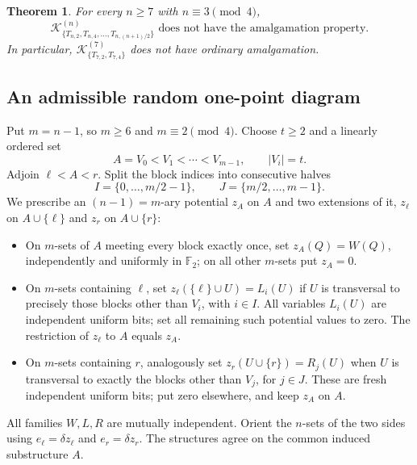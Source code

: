 \documentclass[11pt,a4paper]{article}
\newtheorem{theorem}{Theorem}[section]
\theoremstyle{remark}
\newcommand{\F}{\mathbb F_2}
\newcommand{\K}{\mathcal K}
\begin{document}
\begin{theorem}\label{thm:p3}
For every $n\ge7$ with $n\equiv3\pmod4$,
\[
 \boxed{\K^{(n)}_{\{T_{n,2},T_{n,4},\ldots,T_{n,(n+1)/2}\}}
 \text{ does not have the amalgamation property.}}
\]
In particular, $\K^{(7)}_{\{T_{7,2},T_{7,4}\}}$ does not
have ordinary amalgamation.
\end{theorem}

\subsection{An admissible random one-point diagram}
Put $m=n-1$, so $m\ge6$ and $m\equiv2\pmod4$. Choose $t\ge2$ and a
linearly ordered set
\[
 A=V_0< V_1<\cdots<V_{m-1},\qquad |V_i|=t.
\]
Adjoin $\ell<A<r$. Split the block indices into consecutive halves
\[
 I=\{0,\ldots,m/2-1\},\qquad
 J=\{m/2,\ldots,m-1\}.
\]
We prescribe an $(n-1)=m$-ary potential $z_A$ on $A$ and two
extensions of it, $z_\ell$ on $A\cup\{\ell\}$ and
$z_r$ on $A\cup\{r\}$:
\begin{itemize}
\item On $m$-sets of $A$ meeting every block exactly once, set
$z_A(Q)=W(Q)$, independently and uniformly in $\F$; on all other
$m$-sets put $z_A=0$.
\item On $m$-sets containing $\ell$, set
$z_\ell(\{\ell\}\cup U)=L_i(U)$ if $U$ is transversal to precisely
those blocks other than $V_i$, with $i\in I$. All variables $L_i(U)$
are independent uniform bits; set all remaining such potential values
to zero. The restriction of $z_\ell$ to $A$ equals $z_A$.
\item On $m$-sets containing $r$, analogously set
$z_r(U\cup\{r\})=R_j(U)$ when $U$ is transversal to exactly the
blocks other than $V_j$, for $j\in J$. These are fresh independent
uniform bits; put zero elsewhere, and keep $z_A$ on $A$.
\end{itemize}
All families $W,L,R$ are mutually independent. Orient the $n$-sets of
the two sides using
$e_\ell=\delta z_\ell$ and $e_r=\delta z_r$.
The structures agree on the common induced substructure $A$.
\end{document}
